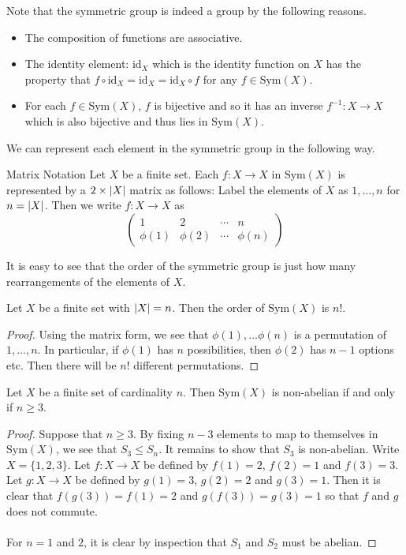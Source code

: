 \documentclass[a4paper]{article}
\begin{document}
Note that the symmetric group is indeed a group by the following reasons. 
\begin{itemize}
\item The composition of functions are associative. 
\item The identity element: $\text{id}_X$ which is the identity function on $X$ has the property that $f\circ\text{id}_X=\text{id}_X=\text{id}_X\circ f$ for any $f\in\text{Sym}(X)$. 
\item For each $f\in\text{Sym}(X)$, $f$ is bijective and so it has an inverse $f^{-1}:X\to X$ which is also bijective and thus lies in $\text{Sym}(X)$. 
\end{itemize}

We can represent each element in the symmetric group in the following way. 

\begin{defn}{Matrix Notation}{} Let $X$ be a finite set. Each $f:X\to X$ in $\text{Sym}(X)$ is represented by a $2\times\abs{X}$ matrix as follows: Label the elements of $X$ as $1,\dots,n$ for $n=\abs{X}$. Then we write $f:X\to X$ as $$\begin{pmatrix}
1 & 2 & \cdots & n\\
\phi(1) & \phi(2) & \cdots & \phi(n)
\end{pmatrix}$$
\end{defn}

It is easy to see that the order of the symmetric group is just how many rearrangements of the elements of $X$. 

\begin{lmm}{}{} Let $X$ be a finite set with $\abs{X}=n$. Then the order of $\text{Sym}(X)$ is $n!$. \tcbline
\begin{proof}
Using the matrix form, we see that $\phi(1),\dots\phi(n)$ is a permutation of $1,\dots,n$. In particular, if $\phi(1)$ has $n$ possibilities, then $\phi(2)$ has $n-1$ options etc. Then there will be $n!$ different permutations. 
\end{proof}
\end{lmm}

\begin{prp}{}{} Let $X$ be a finite set of cardinality $n$. Then $\text{Sym}(X)$ is non-abelian if and only if $n\geq 3$. \tcbline
\begin{proof}
Suppose that $n\geq 3$. By fixing $n-3$ elements to map to themselves in $\text{Sym}(X)$, we see that $S_3\leq S_n$. It remains to show that $S_3$ is non-abelian. Write $X=\{1,2,3\}$. Let $f:X\to X$ be defined by $f(1)=2$, $f(2)=1$ and $f(3)=3$. Let $g:X\to X$ be defined by $g(1)=3$, $g(2)=2$ and $g(3)=1$. Then it is clear that $f(g(3))=f(1)=2$ and $g(f(3))=g(3)=1$ so that $f$ and $g$ does not commute. \\~\\

For $n=1$ and $2$, it is clear by inspection that $S_1$ and $S_2$ must be abelian. 
\end{proof}
\end{prp}
\end{document}
